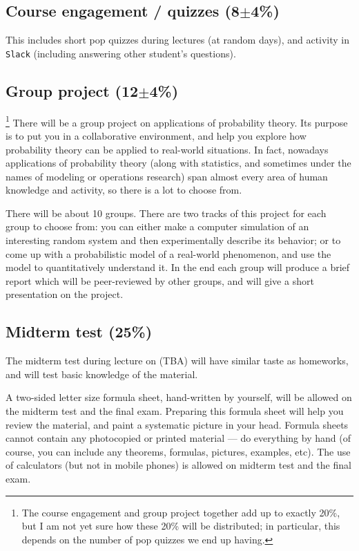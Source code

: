 \documentclass[oneside,11pt]{amsart}
\newcommand{\note}[1]{{\sf{}\color{blue}(#1)}}
\begin{document}
\subsection{Course engagement / quizzes (8$\pm$4\%)}

This includes short pop quizzes during lectures (at random days), 
and activity in \texttt{Slack} (including answering other student's questions).

\subsection{Group project (12$\pm$4\%)}\footnote{%
	The course engagement and group project together add up to exactly 20\%, but 
	I am not yet sure how these 20\% will be distributed; in particular, this 
	depends on the number of pop quizzes we end up having.
}\label{group_project}%
There will be a group project on applications of probability theory.
Its purpose is to put you in a collaborative environment,
and help you explore how probability theory can be applied
to real-world situations.
In fact, nowadays applications of probability theory (along with statistics,
and sometimes under the names of modeling or operations research)
span almost every area of human knowledge and activity, so there is a lot to choose from.

There will be about 10 groups. There are two tracks of this project
for each group to choose from:
you can either make a computer simulation of an interesting random 
system and then experimentally describe its behavior;
or to come up with a probabilistic model of a real-world phenomenon, and 
use the model to quantitatively understand it.
In the end each group will produce a brief report which will be peer-reviewed by other 
groups, and will give a short presentation on the
project.

\subsection{Midterm test (25\%)}

The midterm test during lecture 
on \note{TBA} will have similar taste as homeworks, and will test basic knowledge of the material.

A two-sided letter size formula sheet, hand-written by yourself, will be
allowed on the midterm test and the final exam. Preparing this formula sheet
will help you review the material, and paint a systematic picture in your head.
Formula sheets cannot contain any photocopied or printed material
--- do everything by hand (of course, you can include any theorems, formulas, pictures, 
examples, etc).
The use of calculators (but not in mobile phones)
is allowed on midterm test and the final exam.
\end{document}
